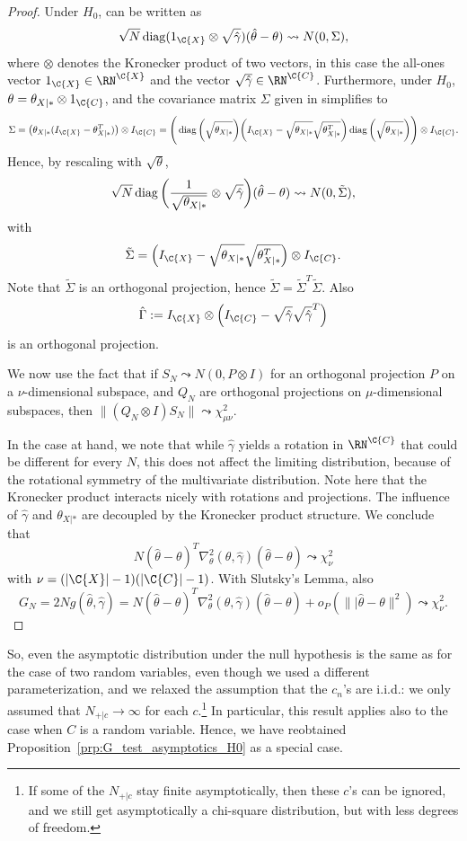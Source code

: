 \begin{proof}
  Under $H_0$,  can be written as
  $$\sqrt{N} \diag(1_{\C{X}} \otimes \sqrt{\hat\gamma}) (\hat\theta - \theta)  \leadsto N(0,\Sigma),$$
  where $\otimes$ denotes the Kronecker product of two vectors, in this case the all-ones vector $1_{\C{X}} \in \RN^{\C{X}}$
  and the vector $\sqrt{\hat\gamma} \in \RN^{\C{C}}$.
  Furthermore, under $H_0$, $\theta = \theta_{X|\ast} \otimes 1_{\C{C}}$, and
  the covariance matrix $\Sigma$ given in  simplifies to
  $$\Sigma = \big(\theta_{X|\ast} (I_{\C{X}} - \theta_{X|\ast}^T)\big) \otimes I_{\C{C}}
           = \Bigg(\diag\bigg(\sqrt{\theta_{X|\ast}}\bigg) \bigg(I_{\C{X}} - \sqrt{\theta_{X|\ast}}\sqrt{\theta_{X|\ast}^T}\bigg) \diag\bigg(\sqrt{\theta_{X|\ast}}\bigg)\Bigg) \otimes I_{\C{C}}.$$
  Hence, by rescaling with $\sqrt{\theta}$,
  $$\sqrt{N} \operatorname*{\mathrm{diag}}\bigg(\frac{1}{\sqrt{\theta_{X|\ast}}} \otimes \sqrt{\hat\gamma}\bigg) (\hat\theta - \theta) \leadsto N(0,\tilde\Sigma),$$
  with
  $$\tilde\Sigma = \Big(I_{\C{X}} - \sqrt{\theta_{X|\ast}} \sqrt{\theta_{X|\ast}^T}\Big) \otimes I_{\C{C}}.$$
  Note that $\tilde\Sigma$ is an orthogonal projection, hence $\tilde\Sigma = \tilde\Sigma^T \tilde\Sigma$.
  Also
  $$\hat\Gamma := I_{\C{X}} \otimes \Big(I_{\C{C}} - \sqrt{\hat\gamma} \sqrt{\hat\gamma}^T\Big)$$
  is an orthogonal projection.

  We now use the fact that if $S_N \leadsto N(0,P \otimes I)$ for an orthogonal projection $P$ on a $\nu$-dimensional
  subspace, and $Q_N$ are orthogonal projections on $\mu$-dimensional subspaces, then
  $\lVert (Q_N \otimes I) S_N \rVert \leadsto \chi^2_{\mu\nu}$. 
  
  In the case at hand, we note that while $\hat\gamma$ yields a rotation in $\RN^{\C{C}}$ that could be different for
  every $N$, this does not affect the limiting distribution, because of the rotational symmetry of the multivariate
  distribution. Note here that the Kronecker product interacts nicely with rotations and projections. The influence
  of $\hat\gamma$ and $\theta_{X|\ast}$ are decoupled by the Kronecker product structure.
  We conclude that
    $$N (\hat\theta - \theta)^T \nabla_\theta^2(\theta,\hat\gamma) (\hat\theta - \theta) \leadsto \chi^2_{\nu}$$
  with $\nu = (|\C{X}|-1)(|\C{C}|-1)$.
  With Slutsky's Lemma, also
  $$G_N = 2N g(\hat\theta,\hat\gamma) = N (\hat\theta - \theta)^T \nabla_\theta^2(\theta,\hat\gamma) (\hat\theta - \theta) + o_P(\lVert|\hat\theta - \theta\rVert^2) \leadsto \chi^2_{\nu}.$$
\end{proof}
So, even the asymptotic distribution under the null hypothesis is the same as for the case of two random variables, 
even though we used a different parameterization,
and we relaxed the assumption that the $c_n$'s are i.i.d.:
we only assumed that $N_{+|c} \to \infty$ for each $c$.\footnote{If some of the $N_{+|c}$ stay finite asymptotically, then these $c$'s can be ignored, and we still get asymptotically a chi-square distribution, but with less degrees of freedom.}
In particular, this result applies also to the case when
$C$ is a random variable. Hence, we have reobtained Proposition~\ref{prp:G_test_asymptotics_H0} as a special case.

